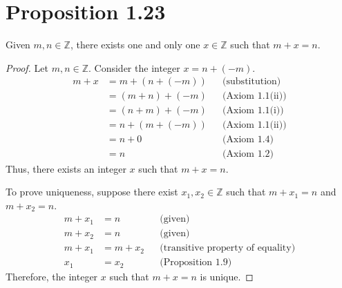 \section*{Proposition 1.23}
Given $m, n \in \mathbb{Z}$, there exists one and only one $x \in \mathbb{Z}$ such that $m+x = n$.
\begin{proof}
    Let $m, n \in \mathbb{Z}$. Consider the integer $x = n + (-m)$.
    \begin{align*}
        m + x & = m + (n + (-m)) &  & \text{(substitution)}  \\
              & = (m + n) + (-m) &  & \text{(Axiom 1.1(ii))} \\
              & = (n + m) + (-m) &  & \text{(Axiom 1.1(i))}  \\
              & = n + (m + (-m)) &  & \text{(Axiom 1.1(ii))} \\
              & = n + 0          &  & \text{(Axiom 1.4)}     \\
              & = n              &  & \text{(Axiom 1.2)}
    \end{align*}
    Thus, there exists an integer $x$ such that $m + x = n$.

    To prove uniqueness, suppose there exist $x_1, x_2 \in \mathbb{Z}$ such that $m + x_1 = n$ and $m + x_2 = n$.
    \begin{align*}
        m + x_1 & = n       &  & \text{(given)}                           \\
        m + x_2 & = n       &  & \text{(given)}                           \\
        m + x_1 & = m + x_2 &  & \text{(transitive property of equality)} \\
        x_1     & = x_2     &  & \text{(Proposition 1.9)}
    \end{align*}
    Therefore, the integer $x$ such that $m + x = n$ is unique.
\end{proof}

